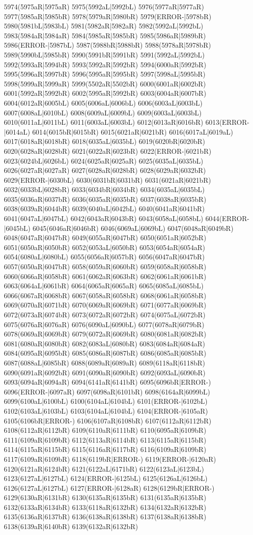 5974(5975aR|5975aR) 5975(5992aL|5992bL) 5976(5977aR|5977aR) 5977(5985aR|5985bR) 5978(5979aR|5980bR) 5979(ERROR-|5978bR) 5980(5981bL|5983bL) 5981(5982aR|5982aR) 5982(5992aL|5992bL) 5983(5984aR|5984aR) 5984(5985aR|5985bR) 5985(5986aR|5989bR) 5986(ERROR-|5987bL) 5987(5988bR|5988bR) 5988(5978aR|5978bR) 5989(5990bL|5985bR) 5990(5991bR|5991bR) 5991(5992aL|5992bL) 5992(5993aR|5994bR) 5993(5992aR|5992bR) 5994(6000aR|5992bR) 5995(5996aR|5997bR) 5996(5995aR|5995bR) 5997(5998aL|5995bR) 5998(5999aR|5999aR) 5999(5502aR|5502bR) 6000(6001aR|6002bR) 6001(5992aR|5992bR) 6002(5995aR|5992bR) 6003(6004aR|6007bR) 6004(6012aR|6005bL) 6005(6006aL|6006bL) 6006(6003aL|6003bL) 6007(6008aL|6010bL) 6008(6009aL|6009bL) 6009(6003aL|6003bL) 6010(6011aL|6011bL) 6011(6003aL|6003bL) 6012(6013aR|6016bR) 6013(ERROR-|6014aL) 6014(6015bR|6015bR) 6015(6021aR|6021bR) 6016(6017aL|6019aL) 6017(6018aR|6018bR) 6018(6035aL|6035bL) 6019(6020bR|6020bR) 6020(6028aR|6028bR) 6021(6022aR|6023bR) 6022(ERROR-|6021bR) 6023(6024bL|6026bL) 6024(6025aR|6025aR) 6025(6035aL|6035bL) 6026(6027aR|6027aR) 6027(6028aR|6028bR) 6028(6029aR|6032bR) 6029(ERROR-|6030bL) 6030(6031bR|6031bR) 6031(6021aR|6021bR) 6032(6033bL|6028bR) 6033(6034bR|6034bR) 6034(6035aL|6035bL) 6035(6036aR|6037bR) 6036(6035aR|6035bR) 6037(6038aR|6035bR) 6038(6039aR|6044bR) 6039(6040aL|6042bL) 6040(6041aR|6041bR) 6041(6047aL|6047bL) 6042(6043aR|6043bR) 6043(6058aL|6058bL) 6044(ERROR-|6045bL) 6045(6046aR|6046bR) 6046(6069aL|6069bL) 6047(6048aR|6049bR) 6048(6047aR|6047bR) 6049(6055aR|6047bR) 6050(6051aR|6052bR) 6051(6050aR|6050bR) 6052(6053aL|6050bR) 6053(6054aR|6054aR) 6054(6080aL|6080bL) 6055(6056aR|6057bR) 6056(6047aR|6047bR) 6057(6050aR|6047bR) 6058(6059aR|6060bR) 6059(6058aR|6058bR) 6060(6066aR|6058bR) 6061(6062aR|6063bR) 6062(6061aR|6061bR) 6063(6064aL|6061bR) 6064(6065aR|6065aR) 6065(6085aL|6085bL) 6066(6067aR|6068bR) 6067(6058aR|6058bR) 6068(6061aR|6058bR) 6069(6070aR|6071bR) 6070(6069aR|6069bR) 6071(6077aR|6069bR) 6072(6073aR|6074bR) 6073(6072aR|6072bR) 6074(6075aL|6072bR) 6075(6076aR|6076aR) 6076(6090aL|6090bL) 6077(6078aR|6079bR) 6078(6069aR|6069bR) 6079(6072aR|6069bR) 6080(6081aR|6082bR) 6081(6080aR|6080bR) 6082(6083aL|6080bR) 6083(6084aR|6084aR) 6084(6095aR|6095bR) 6085(6086aR|6087bR) 6086(6085aR|6085bR) 6087(6088aL|6085bR) 6088(6089aR|6089aR) 6089(6118aR|6118bR) 6090(6091aR|6092bR) 6091(6090aR|6090bR) 6092(6093aL|6090bR) 6093(6094aR|6094aR) 6094(6141aR|6141bR) 6095(6096bR|ERROR-) 6096(ERROR-|6097aR) 6097(6098aR|6101bR) 6098(6164aR|6099bL) 6099(6100aL|6100bL) 6100(6104aL|6104bL) 6101(ERROR-|6102bL) 6102(6103aL|6103bL) 6103(6104aL|6104bL) 6104(ERROR-|6105aR) 6105(6106bR|ERROR-) 6106(6107aR|6108bR) 6107(6112aR|6112bR) 6108(6112aR|6112bR) 6109(6110aR|6111bR) 6110(6095aR|6109bR) 6111(6109aR|6109bR) 6112(6113aR|6114bR) 6113(6115aR|6115bR) 6114(6115aR|6115bR) 6115(6116aR|6117bR) 6116(6109aR|6109bR) 6117(6109aR|6109bR) 6118(6119bR|ERROR-) 6119(ERROR-|6120aR) 6120(6121aR|6124bR) 6121(6122aL|6171bR) 6122(6123aL|6123bL) 6123(6127aL|6127bL) 6124(ERROR-|6125bL) 6125(6126aL|6126bL) 6126(6127aL|6127bL) 6127(ERROR-|6128aR) 6128(6129bR|ERROR-) 6129(6130aR|6131bR) 6130(6135aR|6135bR) 6131(6135aR|6135bR) 6132(6133aR|6134bR) 6133(6118aR|6132bR) 6134(6132aR|6132bR) 6135(6136aR|6137bR) 6136(6138aR|6138bR) 6137(6138aR|6138bR) 6138(6139aR|6140bR) 6139(6132aR|6132bR) 